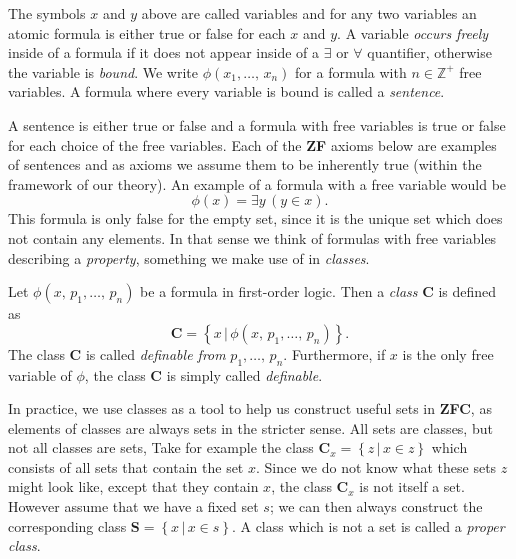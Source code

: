 \documentclass[../../main.tex]{subfiles}
\begin{document}
The symbols $x$ and $y$ above are called variables and for any two variables an atomic formula is either true or false for each $x$ and $y$.
A variable \textit{occurs freely} inside of a formula if it does not appear inside of a $\exists$ or $\forall$ quantifier, otherwise the variable is \textit{bound}.
We write $\phi\left(x_1,\ldots,\, x_n\right)$ for a formula with $n \in \mathbb{Z}^+$ free variables.
A formula where every variable is bound is called a \textit{sentence}. \cite[pp.10-11]{Mar02}

A sentence is either true or false and a formula with free variables is true or false for each choice of the free variables.
Each of the \textbf{ZF} axioms below are examples of sentences and as axioms we assume them to be inherently true (within the framework of our theory).
An example of a formula with a free variable would be $$\phi(x) = \exists y \, \left(y \in x\right).$$ 
This formula is only false for the empty set, since it is the unique set which does not contain any elements.
In that sense we think of formulas with free variables describing a \textit{property}, something we make use of in \textit{classes}.

\begin{definition}[Class]
    Let $\phi\left(x,\, p_1,\ldots,\, p_n\right)$ be a formula in first-order logic.
    Then a \textit{class} $\mathbf{C}$ is defined as
    $$\mathbf{C} = \left\{x \,\vert\, \phi\left(x,\, p_1,\ldots,\, p_n\right)\right\}.$$
    The class $\mathbf{C}$ is called \textit{definable from} $p_1,\ldots,\, p_n$.
    Furthermore, if $x$ is the only free variable of $\phi$, the class $\mathbf{C}$ is simply called \textit{definable}. \cite[p.3]{Jec78}
\end{definition}

In practice, we use classes as a tool to help us construct useful sets in \textbf{ZFC}, as elements of classes are always sets in the stricter sense.
All sets are classes, but not all classes are sets, 
Take for example the class $\mathbf{C}_x = \left\{z \,\vert\, x \in z\right\}$ which consists of all sets that contain the set $x$.
Since we do not know what these sets $z$ might look like, except that they contain $x$, the class $\mathbf{C}_x$ is not itself a set.
However assume that we have a fixed set $s$; we can then always construct the corresponding class $\mathbf{S} = \left\{x \,\vert\, x \in s\right\}$.
A class which is not a set is called a \textit{proper class}.
\end{document}
